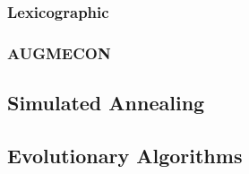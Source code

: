     \subsubsection{Lexicographic}

    \subsubsection{AUGMECON}

\subsection{Simulated Annealing}

\subsection{Evolutionary Algorithms}